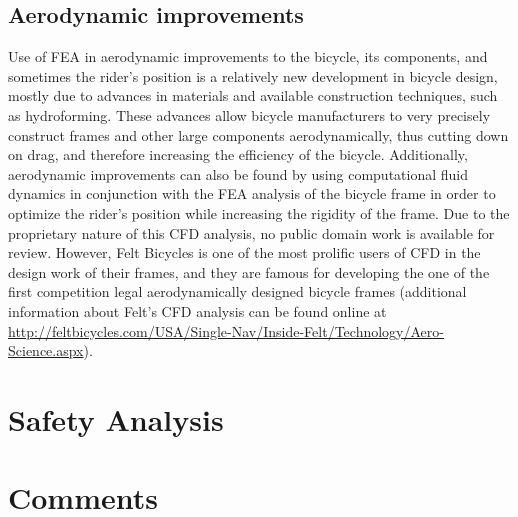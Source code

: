 \documentclass[11pt]{article}
\begin{document}
\subsection{Aerodynamic improvements}
Use of FEA in aerodynamic improvements to the bicycle, its components, and sometimes the rider's position is a relatively new development in bicycle design, mostly due to advances in materials and available construction techniques, such as hydroforming.  These advances allow bicycle manufacturers to very precisely construct frames and other large components aerodynamically, thus cutting down on drag, and therefore increasing the efficiency of the bicycle.  Additionally, aerodynamic improvements can also be found by using computational fluid dynamics in conjunction with the FEA analysis of the bicycle frame in order to optimize the rider's position while increasing the rigidity of the frame.  Due to the proprietary nature of this CFD analysis, no public domain work is available for review.  However, Felt Bicycles is one of the most prolific users of CFD in the design work of their frames, and they are famous for developing the one of the first competition legal aerodynamically designed bicycle frames (additional information about Felt's CFD analysis can be found online at \url{http://feltbicycles.com/USA/Single-Nav/Inside-Felt/Technology/Aero-Science.aspx}).

\section{Safety Analysis}

\section{Comments}
\end{document}
